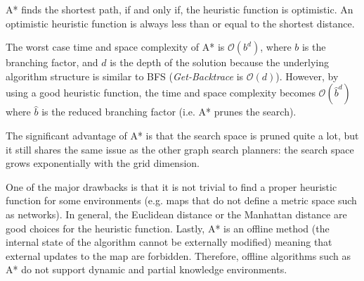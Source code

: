 A* finds the shortest path, if and only if, the heuristic function is optimistic. An optimistic heuristic function is always less than or equal to the shortest distance.

The worst case time and space complexity of A* is $\mathcal{O}(b^d)$, where $b$ is the branching factor, and $d$ is the depth of the solution because the underlying algorithm structure is similar to BFS (\textit{Get-Backtrace} is $\mathcal{O}(d)$). However, by using a good heuristic function, the time and space complexity becomes $\mathcal{O}(\hat{b}^d)$ where $\hat{b}$ is the reduced branching factor (i.e. A* prunes the search).


The significant advantage of A* is that the search space is pruned quite a lot, but it still shares the same issue as the other graph search planners: the search space grows exponentially with the grid dimension.

One of the major drawbacks is that it is not trivial to find a proper heuristic function for some environments (e.g. maps that do not define a metric space such as networks). In general, the Euclidean distance or the Manhattan distance are good choices for the heuristic function. Lastly, A* is an offline method (the internal state of the algorithm cannot be externally modified) meaning that external updates to the map are forbidden. Therefore, offline algorithms such as A* do not support dynamic and partial knowledge environments.

\pagebreak

